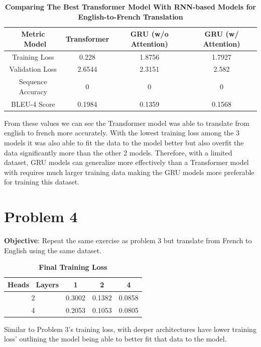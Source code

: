\documentclass[a4paper]{article}
\begin{document}
\begin{table}[H]
    \centering
    \caption{\textbf{Comparing The Best Transformer Model With RNN-based Models for English-to-French Translation}}
    \label{tab:eng2fraComp}
    \begin{tabular}{| c || c | c | c |}
        \hline
        Metric \ Model & Transformer & GRU (w/o Attention) & GRU (w/ Attention) \\
        \hline
        Training Loss & 0.228 & 1.8756 & 1.7927 \\
        \hline
        Validation Loss & 2.6544 & 2.3151 & 2.582 \\
        \hline
        Sequence Accuracy & 0 & 0 & 0 \\
        \hline
        BLEU-4 Score & 0.1984 & 0.1359 & 0.1568 \\
        \hline 
    \end{tabular}
\end{table}

From these values we can see the Transformer model was able to translate from english to french more accurately. With the lowest training loss among the 3 models it was also able to fit the data to the model better but also overfit the data significantly more than the other 2 models. Therefore, with a limited dataset, GRU models can generalize more effectively than a Transformer model with requires much larger training data making the GRU models more preferable for training this dataset.

\section*{\textbf{Problem 4}}
\textbf{Objective}: Repeat the same exercise as problem 3 but translate from French to English using the same dataset.

\begin{table}[H]
    \centering
    \caption{\textbf{Final Training Loss}}
    \label{tab:finalTLp4}
    \begin{tabular}{| c || c | c | c |}
        \hline
        Heads \ Layers & 1 & 2 & 4 \\
        \hline
        2 & 0.3002 & 0.1382 & 0.0858 \\
        \hline
        4 & 0.2053 & 0.1053 & 0.0805 \\
        \hline
    \end{tabular}
\end{table}

Similar to Problem 3's training loss, with deeper architectures have lower training loss' outlining the model being able to better fit that data to the model.
\end{document}
